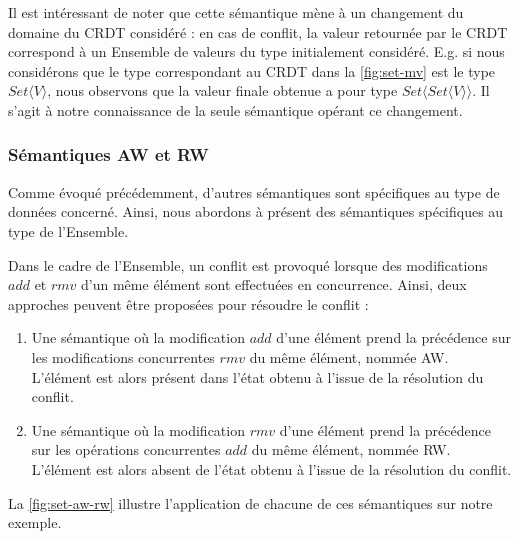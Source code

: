 \documentclass[12pt]{thesul}
\newcommand{\trm}[1]{\mathit{#1}}
\begin{document}
Il est intéressant de noter que cette sémantique mène à un changement du domaine du \ac{CRDT} considéré : en cas de conflit, la valeur retournée par le \ac{CRDT} correspond à un Ensemble de valeurs du type initialement considéré.
E.g. si nous considérons que le type correspondant au \ac{CRDT} dans la \autoref{fig:set-mv} est le type $\trm{Set}\langle V \rangle$, nous observons que la valeur finale obtenue a pour type $\trm{Set}\langle \trm{Set}\langle V \rangle \rangle$.
Il s'agit à notre connaissance de la seule sémantique opérant ce changement.

\subsubsection{Sémantiques \acl{AW} et \acl{RW}}

Comme évoqué précédemment, d'autres sémantiques sont spécifiques au type de données concerné.
Ainsi, nous abordons à présent des sémantiques spécifiques au type de l'Ensemble.

Dans le cadre de l'Ensemble, un conflit est provoqué lorsque des modifications $\trm{add}$ et $\trm{rmv}$ d'un même élément sont effectuées en concurrence.
Ainsi, deux approches peuvent être proposées pour résoudre le conflit :

\begin{enumerate}[label=(\roman*)]
  \item Une sémantique où la modification $\trm{add}$ d'une élément prend la précédence sur les modifications concurrentes $\trm{rmv}$ du même élément, nommée \acf{AW}.
    L'élément est alors présent dans l'état obtenu à l'issue de la résolution du conflit.
  \item Une sémantique où la modification $\trm{rmv}$ d'une élément prend la précédence sur les opérations concurrentes $\trm{add}$ du même élément, nommée \acf{RW}.
    L'élément est alors absent de l'état obtenu à l'issue de la résolution du conflit.
\end{enumerate}

La \autoref{fig:set-aw-rw} illustre l'application de chacune de ces sémantiques sur notre exemple.
\end{document}
